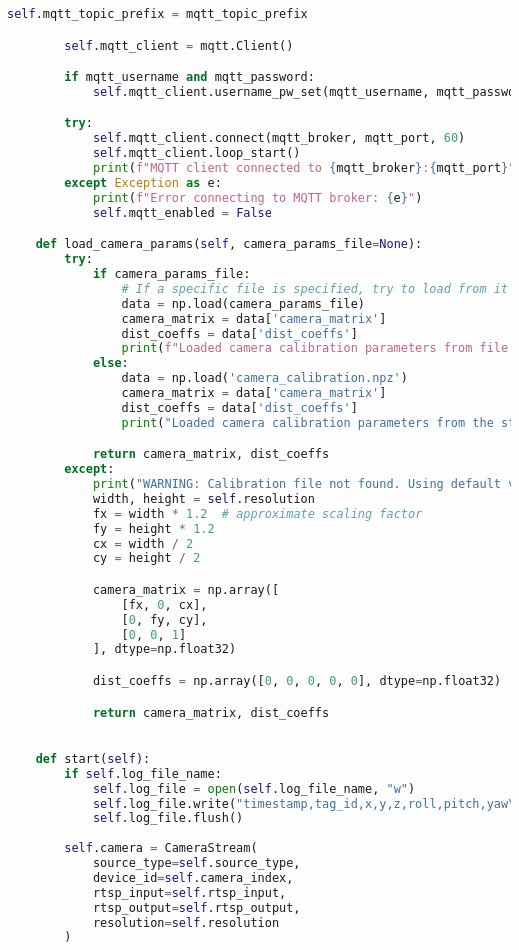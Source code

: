 \begin{lstlisting}[language=Python]
        self.mqtt_topic_prefix = mqtt_topic_prefix

        self.mqtt_client = mqtt.Client()

        if mqtt_username and mqtt_password:
            self.mqtt_client.username_pw_set(mqtt_username, mqtt_password)

        try:
            self.mqtt_client.connect(mqtt_broker, mqtt_port, 60)
            self.mqtt_client.loop_start()
            print(f"MQTT client connected to {mqtt_broker}:{mqtt_port}")
        except Exception as e:
            print(f"Error connecting to MQTT broker: {e}")
            self.mqtt_enabled = False

    def load_camera_params(self, camera_params_file=None):
        try:
            if camera_params_file:
                # If a specific file is specified, try to load from it
                data = np.load(camera_params_file)
                camera_matrix = data['camera_matrix']
                dist_coeffs = data['dist_coeffs']
                print(f"Loaded camera calibration parameters from file {camera_params_file}")
            else:
                data = np.load('camera_calibration.npz')
                camera_matrix = data['camera_matrix']
                dist_coeffs = data['dist_coeffs']
                print("Loaded camera calibration parameters from the standard file")

            return camera_matrix, dist_coeffs
        except:
            print("WARNING: Calibration file not found. Using default values.")
            width, height = self.resolution
            fx = width * 1.2  # approximate scaling factor
            fy = height * 1.2
            cx = width / 2
            cy = height / 2

            camera_matrix = np.array([
                [fx, 0, cx],
                [0, fy, cy],
                [0, 0, 1]
            ], dtype=np.float32)

            dist_coeffs = np.array([0, 0, 0, 0, 0], dtype=np.float32)

            return camera_matrix, dist_coeffs

            
    def start(self):
        if self.log_file_name:
            self.log_file = open(self.log_file_name, "w")
            self.log_file.write("timestamp,tag_id,x,y,z,roll,pitch,yaw\n")
            self.log_file.flush()
    
        self.camera = CameraStream(
            source_type=self.source_type,
            device_id=self.camera_index,
            rtsp_input=self.rtsp_input,
            rtsp_output=self.rtsp_output,
            resolution=self.resolution
        )
    

\end{lstlisting}
